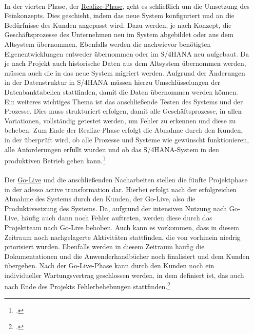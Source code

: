 \vspace{1em}
\\In der vierten Phase, der \underline{\glqq{}Realize\grqq{}-Phase}, geht es schließlich um die Umsetzung des Feinkonzepts. Dies geschieht, indem das neue System konfiguriert und an die Bedürfnisse des Kunden angepasst wird. Dazu werden, je nach Konzept, die Geschäftsprozesse des Unternehmen neu im System abgebildet oder aus dem Altsystem übernommen. Ebenfalls werden die nachwievor benötigten Eigenentwicklungen entweder übernommen oder im S/4HANA neu aufgebaut. Da je nach Projekt auch historische Daten aus dem Altsystem übernommen werden, müssen auch die in das neue System migriert werden. Aufgrund der Änderungen in der Datenstruktur in S/4HANA müssen hierzu Umschlüsselungen der Datenbanktabellen stattfinden, damit die Daten übernommen werden können. Ein weiteres wichtiges Thema ist das anschließende Testen des Systems und der Prozesse. Dies muss strukturiert erfolgen, damit alle Geschäftsprozesse, in allen Variationen, vollständig getestet werden, um Fehler zu erkennen und diese zu beheben. Zum Ende der Realize-Phase erfolgt die Abnahme durch den Kunden, in der überprüft wird, ob alle Prozesse und Systeme wie gewünscht funktionieren, alle Anforderungen erfüllt wurden und ob das S/4HANA-System in den produktiven Betrieb gehen kann.\footcite[Vgl.][]{aat-realize}\\
\vspace{1em}
\\Der \underline{\glqq{}Go-Live\grqq{}} und die anschließenden Nacharbeiten stellen die fünfte Projektphase in der adesso active transformation dar. Hierbei erfolgt nach der erfolgreichen Abnahme des Systems durch den Kunden, der Go-Live, also die Produktivsetzung des Systems. Da, aufgrund der intensiven Nutzung nach Go-Live, häufig auch dann noch Fehler auftreten, werden diese durch das Projektteam nach Go-Live behoben. Auch kann es vorkommen, dass in diesem Zeitraum noch nachgelagerte Aktivitäten stattfinden, die von vorhinein niedrig priorisiert wurden. Ebenfalls werden in diesem Zeitraum häufig die Dokumentationen und die Anwenderhandbücher noch finalisiert und dem Kunden übergeben. Nach der Go-Live-Phase kann durch den Kunden noch ein individueller Wartungsvertrag geschlossen werden, in dem definiert ist, das auch nach Ende des Projekts Fehlerbehebungen stattfinden.\footcite[Vgl.][]{aat-golive}


